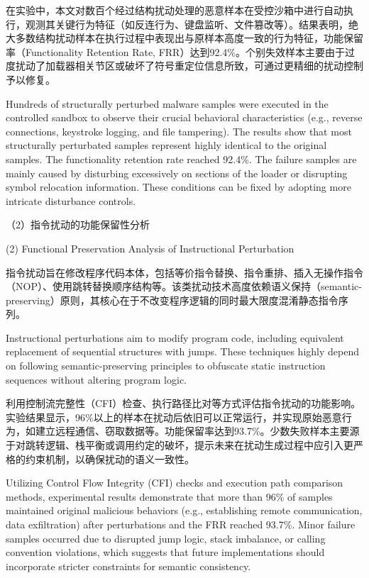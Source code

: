 在实验中，本文对数百个经过结构扰动处理的恶意样本在受控沙箱中进行自动执行，观测其关键行为特征（如反连行为、键盘监听、文件篡改等）。结果表明，绝大多数结构扰动样本在执行过程中表现出与原样本高度一致的行为特征，功能保留率（Functionality Retention Rate, FRR）达到92.4\%。个别失效样本主要由于过度扰动了加载器相关节区或破坏了符号重定位信息所致，可通过更精细的扰动控制予以修复。

Hundreds of structurally perturbed malware samples were executed in the controlled sandbox to observe their crucial behavioral characteristics (e.g., reverse connections, keystroke logging, and file tampering). The results show that most structurally perturbated samples represent highly identical to the original samples. The functionality retention rate reached 92.4\%. The failure samples are mainly caused by disturbing excessively on sections of the loader or disrupting symbol relocation information. These conditions can be fixed by adopting more intricate disturbance controls.

（2）指令扰动的功能保留性分析

(2) Functional Preservation Analysis of Instructional Perturbation

指令扰动旨在修改程序代码本体，包括等价指令替换、指令重排、插入无操作指令（NOP）、使用跳转替换顺序结构等。该类扰动技术高度依赖语义保持（semantic-preserving）原则，其核心在于不改变程序逻辑的同时最大限度混淆静态指令序列。

Instructional perturbations aim to modify program code, including equivalent replacement of sequential structures with jumps. These techniques highly depend on following semantic-preserving principles to obfuscate static instruction sequences without altering program logic.

利用控制流完整性（CFI）检查、执行路径比对等方式评估指令扰动的功能影响。实验结果显示，96\%以上的样本在扰动后依旧可以正常运行，并实现原始恶意行为，如建立远程通信、窃取数据等。功能保留率达到93.7\%。少数失败样本主要源于对跳转逻辑、栈平衡或调用约定的破坏，提示未来在扰动生成过程中应引入更严格的约束机制，以确保扰动的语义一致性。

Utilizing Control Flow Integrity (CFI) checks and execution path comparison methods, experimental results demonstrate that more than 96\% of samples maintained original malicious behaviors (e.g., establishing remote communication, data exfiltration) after perturbations and the FRR reached 93.7\%. Minor failure samples occurred due to disrupted jump logic, stack imbalance, or calling convention violations, which suggests that future implementations should incorporate stricter constraints for semantic consistency.

